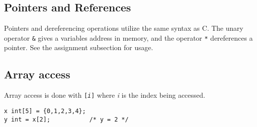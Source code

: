 	\subsection{Pointers and References}
		Pointers and dereferencing operations utilize the same syntax as C. The unary operator \texttt{\&} gives a variables address in memory, and the operator \texttt{*} dereferences a pointer. See the assignment subsection for usage.
		
	\subsection{Array access}
		Array access is done with \texttt{[\textit{i}]} where \textit{i} is the index being accessed. 
		
		\begin{lstlisting}
x int[5] = {0,1,2,3,4};
y int = x[2];  			/* y = 2 */
		\end{lstlisting}
